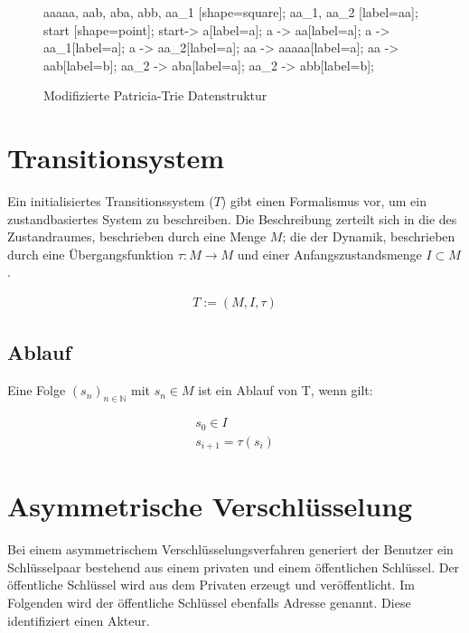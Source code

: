 \documentclass[a4paper,12pt]{report}
\begin{document}
\begin{figure}[ht]
    \centering
    {
      aaaaa, aab, aba, abb, aa_1 [shape=square];
      aa_1, aa_2 [label=aa];
      start [shape=point];
      start-> a[label=a];
      a -> aa[label=a];
      a -> aa_1[label=a];
      a -> aa_2[label=a];
      aa -> aaaaa[label=a];
      aa -> aab[label=b];
      aa_2 -> aba[label=a];
      aa_2 -> abb[label=b];
    }
    \caption{Modifizierte Patricia-Trie Datenstruktur}
    \label{trieImg4}
\end{figure}

\section{Transitionsystem}
\label{transSys}

Ein initialisiertes Transitionssystem ($T$) \cite{Glausch} gibt einen Formalismus vor, um ein zustandbasiertes System zu beschreiben. Die Beschreibung zerteilt sich in die des Zustandraumes, beschrieben durch eine Menge $M$; die der Dynamik, beschrieben durch eine Übergangsfunktion $\tau: M \rightarrow M$ und einer Anfangszustandsmenge $I\subset M$.

\begin{eqnarray}
   T := (M,I,\tau)
\end{eqnarray}

\subsection*{Ablauf}
Eine Folge $(s_n)_{n\in\mathbb{N}}$ mit $s_n\in M$ ist ein Ablauf von T, wenn gilt:

\begin{eqnarray}
   s_0 \in I \\
   s_{i+1} = \tau(s_i) 
\end{eqnarray}


\section{Asymmetrische Verschlüsselung}
\label{crypt}


Bei einem asymmetrischem Verschlüsselungsverfahren generiert der Benutzer ein Schlüsselpaar bestehend aus einem privaten und einem öffentlichen Schlüssel. Der öffentliche Schlüssel wird aus dem Privaten erzeugt und veröffentlicht. Im Folgenden wird der öffentliche Schlüssel ebenfalls Adresse genannt. Diese identifiziert einen Akteur.
\end{document}
